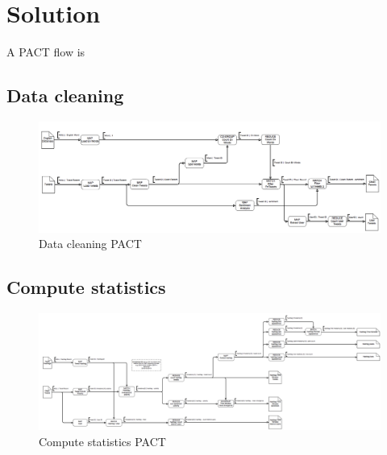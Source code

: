 \section{Solution}
\label{sec:solution}

A PACT flow is 



\subsection{Data cleaning}

\begin{figure}[t]
\includegraphics[width=\textwidth]{images/strato_pact_pt1.png} 
\caption{Data cleaning PACT}
\label{fig:cleaning}
\end{figure}



\subsection{Compute statistics}

\begin{figure}[t]
\includegraphics[width=\textwidth]{images/strato_pact_pt2.png} 
\caption{Compute statistics PACT}
\label{fig:statistics}
\end{figure}
